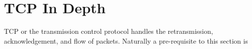\section{TCP In Depth}

TCP or the transmission control protocol handles the retransmission, acknowledgement, and flow of packets. Naturally a pre-requisite to this section is
